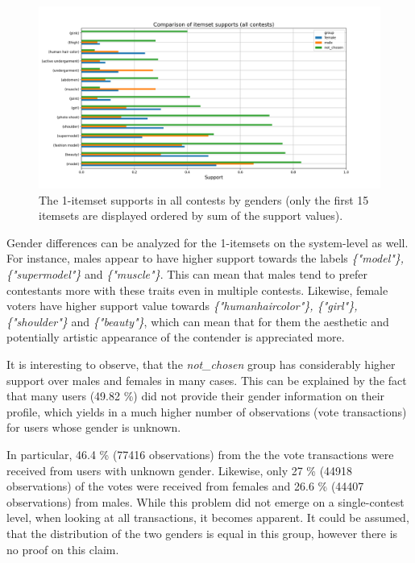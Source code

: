 \begin{figure}[h] 
    \begin{center}
        \includegraphics[width=1.0\textwidth]{Images/itemset_supports-gender-all_contests-1_itemset.png}
        \caption{The 1-itemset supports in all contests by genders (only the first 15 itemsets are displayed ordered by sum of the support values).}
        \label{itemset_supports-gender-all_contests-1_itemset}
    \end{center}
\end{figure}

Gender differences can be analyzed for the 1-itemsets on the system-level as well. For instance, males appear to have higher support towards the labels \emph{\{"model"\}, \{"supermodel"\}} and \emph{\{"muscle"\}}. This can mean that males tend to prefer contestants more with these traits even in multiple contests. Likewise, female voters have higher support value towards \emph{\{"human\:hair\:color"\}, \{"girl"\}, \{"shoulder"\}} and \emph{\{"beauty"\}}, which can mean that for them the aesthetic and potentially artistic appearance of the contender is appreciated more. 

It is interesting to observe, that the \emph{not\_chosen} group has considerably higher support over males and females in many cases. This can be explained by the fact that many users (49.82 \%) did not provide their gender information on their profile, which yields in a much higher number of observations (vote transactions) for users whose gender is unknown. 

In particular, 46.4 \% (77416 observations) from the the vote transactions were received from users with unknown gender. Likewise, only 27 \% (44918 observations) of the votes were received from females and 26.6 \% (44407 observations) from males. While this problem did not emerge on a single-contest level, when looking at all transactions, it becomes apparent. It could be assumed, that the distribution of the two genders is equal in this group, however there is no proof on this claim. 

